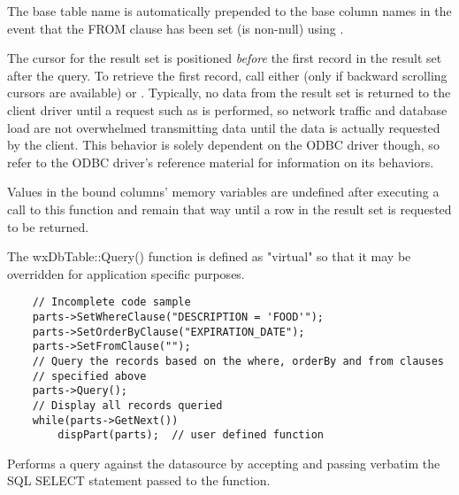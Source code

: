 The base table name is automatically prepended to the base column names in
the event that the FROM clause has been set (is non-null) using
.

The cursor for the result set is positioned {\it before} the first record in
the result set after the query.  To retrieve the first record, call either
 (only if backward scrolling
cursors are available) or
.  Typically, no data from the
result set is returned to the client driver until a request such as
 is performed, so network
traffic and database load are not overwhelmed transmitting data until the
data is actually requested by the client.  This behavior is solely dependent
on the ODBC driver though, so refer to the ODBC driver's reference material
for information on its behaviors.

Values in the bound columns' memory variables are undefined after executing a
call to this function and remain that way until a row in the result set is
requested to be returned.

The wxDbTable::Query() function is defined as "virtual" so that it may be
overridden for application specific purposes.



\begin{verbatim}
    // Incomplete code sample
    parts->SetWhereClause("DESCRIPTION = 'FOOD'");
    parts->SetOrderByClause("EXPIRATION_DATE");
    parts->SetFromClause("");
    // Query the records based on the where, orderBy and from clauses
    // specified above
    parts->Query();
    // Display all records queried
    while(parts->GetNext())
        dispPart(parts);  // user defined function
\end{verbatim}

\label{wxdbtablequerybysqlstmt}


Performs a query against the datasource by accepting and passing verbatim the
SQL SELECT statement passed to the function.

